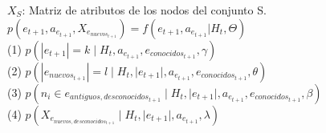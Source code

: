 $X_{S}$: Matriz de atributos de los nodos del conjunto S.\\

$p(e_{t+1}, a_{e_{t+1}}, X_{e_{nuevos_{t+1}}}   ) = f(e_{t+1}, a_{e_{t+1}}|H_{t}, \Theta)$\\

(1) $p(|e_{t+1}| = k \;|\; H_{t}, a_{e_{t+1}}, e_{conocidos_{t+1}}, \gamma)$\\

(2) $p(|e_{nuevos_{t+1}}| = l \;|\; H_{t}, |e_{t+1}|, a_{e_{t+1}}, e_{conocidos_{t+1}}, \theta)$\\

(3) $p(n_{i} \in e_{antiguos,desconocidos_{t+1}} \;|\; H_{t}, |e_{t+1}|, a_{e_{t+1}}, e_{conocidos_{t+1}}, \beta)$\\

(4) $p(X_{e_{nuevos,desconocidos_{t+1}}} \;|\; H_{t}, |e_{t+1}|, a_{e_{t+1}}, \lambda)$\\
